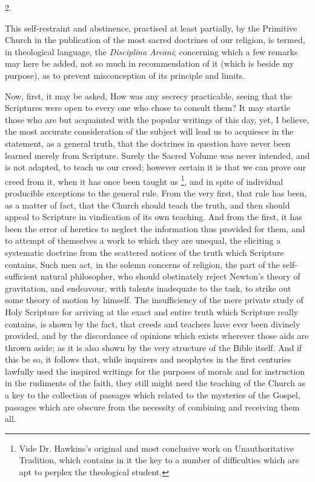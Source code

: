 2.

This self-restraint and abstinence, practised at least partially, by the Primitive Church in the publication of the most
sacred doctrines of our religion, is termed, in theological language,
the \emph{Disciplina Arcani}; concerning which a few remarks may here
be added, not so much in recommendation of it (which is beside my
purpose), as to prevent misconception of its principle and limits.

Now, first, it may be asked, How was any secrecy practicable,
seeing that the Scriptures were open to every one who chose to consult
them? It may startle those who are but acquainted with the popular
writings of this day, yet, I believe, the most accurate consideration
of the subject will lead us to acquiesce in the statement, as a
general truth, that the doctrines in question have never been learned
merely from Scripture. Surely the Sacred Volume was never intended,
and is not adapted, to teach us our creed; however certain it is that
we can prove our creed from it, when it has once been taught us \footnote{Vide Dr. Hawkins's original and most
conclusive work on Unauthoritative Tradition, which contains in it the
key to a number of difficulties which are apt to perplex the
theological student.}, and in spite of individual producible exceptions to the
general rule. From the very first, that rule has been, as a matter of
fact, that the Church should teach the truth, and then should appeal
to Scripture in vindication of its own teaching. And from the first,
it has been the error of heretics to neglect the information thus
provided for them, and to attempt of themselves a work to which they
are unequal, the eliciting a systematic doctrine from the scattered
notices of the truth which Scripture contains. Such men act, in the
solemn concerns of religion, the part of the self-sufficient natural
philosopher, who should obstinately reject Newton's theory of
gravitation, and endeavour, with talents inadequate to the task, to
strike out some theory of motion by himself. The insufficiency of the
mere private study of Holy Scripture for arriving at the exact and
entire truth which Scripture really contains, is shown by the fact,
that creeds and teachers have ever been divinely provided, and by the
discordance of opinions which exists wherever those aids are thrown
aside; as it is also shown by the very structure of the Bible itself.
And if this be so, it follows that, while inquirers and neophytes in
the first centuries lawfully used the inspired writings for the
purposes of morals and for instruction in the rudiments of the faith,
they still might need the teaching of the Church as a key to the
collection of passages which related to the mysteries of the Gospel,
passages which are obscure from the necessity of combining and
receiving them all.

